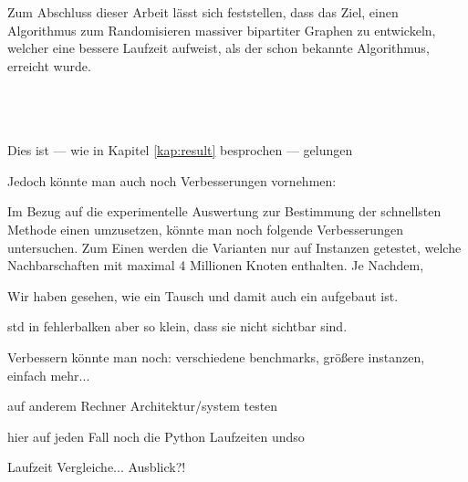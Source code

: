 Zum Abschluss dieser Arbeit lässt sich feststellen, dass das Ziel, einen Algorithmus
zum Randomisieren massiver bipartiter Graphen zu entwickeln, welcher eine bessere Laufzeit aufweist, als der schon bekannte 
\gc{} Algorithmus, erreicht wurde. 



~\\
\\
\\

Dies ist --- wie in Kapitel \ref{kap:result} besprochen --- gelungen




Jedoch könnte man auch noch Verbesserungen vornehmen:


Im Bezug auf die experimentelle Auswertung zur Bestimmung der schnellsten Methode 
einen \ct{} umzusetzen, könnte man noch folgende Verbesserungen untersuchen.
Zum Einen werden die Varianten nur auf Instanzen getestet, welche Nachbarschaften mit 
maximal 4 Millionen Knoten enthalten. Je Nachdem, 


Wir haben gesehen, wie ein \gc{} Tausch und damit auch ein \ct{} aufgebaut ist. 








std in fehlerbalken aber so klein, dass sie nicht sichtbar sind.

Verbessern könnte man noch:
verschiedene benchmarks, größere instanzen, einfach mehr...

auf anderem Rechner Architektur/system testen 

hier auf jeden Fall noch die Python Laufzeiten undso

Laufzeit Vergleiche...
Ausblick?!
